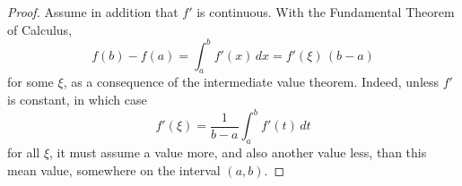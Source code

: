 

\begin{proof} Assume in addition that $f'$ is continuous.
With the Fundamental Theorem of Calculus,
$$
f(b)-f(a) = \int_a^b f'(x)\,dx = f'(\xi)\,(b-a)
$$
for some $\xi$, as a consequence of the intermediate 
value theorem. Indeed, unless $f'$ is constant, in which case 
$$
f'(\xi)=\frac{1}{b-a}\int_a^b f'(t)\,dt
$$
for all $\xi$, it must assume a value more, and also another value less, 
than this mean value, somewhere on the interval $(a,b)$.


\end{proof}

